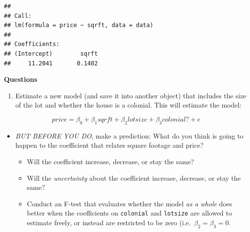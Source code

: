 \documentclass[
]{book}
\providecommand{\tightlist}{%
  \setlength{\itemsep}{0pt}\setlength{\parskip}{0pt}}
\theoremstyle{definition}
\theoremstyle{definition}
\theoremstyle{definition}
\theoremstyle{definition}
\theoremstyle{remark}
\begin{document}
\begin{verbatim}
## 
## Call:
## lm(formula = price ~ sqrft, data = data)
## 
## Coefficients:
## (Intercept)        sqrft  
##     11.2041       0.1402
\end{verbatim}

\textbf{Questions}

\begin{enumerate}
\def\labelenumi{\arabic{enumi}.}
\tightlist
\item
  Estimate a new model (and save it into another object) that includes the size of the lot and whether the house is a colonial. This will estimate the model:
\end{enumerate}

\[ 
  price = \beta_{0} + \beta_{1} sqrft + \beta_{2} lotsize + \beta_{3} colonial? + e
\]

\begin{itemize}
\tightlist
\item
  \emph{BUT BEFORE YOU DO}, make a prediction: What do you think is going to happen to the coefficient that relates square footage and price?

  \begin{itemize}
  \tightlist
  \item
    Will the coefficient increase, decrease, or stay the same?
  \item
    Will the \emph{uncertainty} about the coefficient increase, decrease, or stay the same?
  \item
    Conduct an F-test that evaluates whether the model \emph{as a whole} does better when the coefficients on \texttt{colonial} and \texttt{lotsize} are allowed to estimate freely, or instead are restricted to be zero (i.e.~\(\beta_{2} = \beta_{3} = 0\).
  \end{itemize}
\end{itemize}
\end{document}
